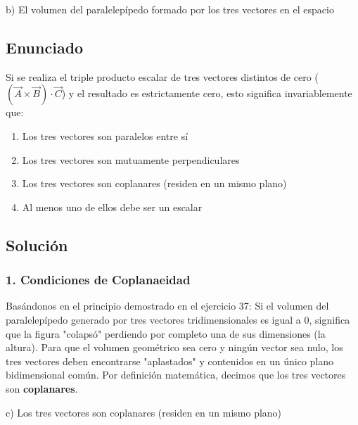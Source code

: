 \documentclass[12pt, a4paper]{article}
\begin{document}
\begin{tcolorbox}[colback=green!5!white, colframe=green!50!black, title=Respuesta Final]
\centering \Large b) El volumen del paralelepípedo formado por los tres vectores en el espacio
\end{tcolorbox}

\newpage


\subsection*{Enunciado}
Si se realiza el triple producto escalar de tres vectores distintos de cero ($(\vec{A} \times \vec{B}) \cdot \vec{C}$) y el resultado es estrictamente cero, esto significa invariablemente que:
\begin{enumerate}[label=\alph*)]
    \item Los tres vectores son paralelos entre sí
    \item Los tres vectores son mutuamente perpendiculares
    \item Los tres vectores son coplanares (residen en un mismo plano)
    \item Al menos uno de ellos debe ser un escalar
\end{enumerate}

\subsection*{Solución}

\subsubsection*{1. Condiciones de Coplanaeidad}
Basándonos en el principio demostrado en el ejercicio 37:
Si el volumen del paralelepípedo generado por tres vectores tridimensionales es igual a $0$, significa que la figura "colapsó" perdiendo por completo una de sus dimensiones (la altura). 
Para que el volumen geométrico sea cero y ningún vector sea nulo, los tres vectores deben encontrarse "aplastados" y contenidos en un único plano bidimensional común. Por definición matemática, decimos que los tres vectores son \textbf{coplanares}.

\begin{tcolorbox}[colback=green!5!white, colframe=green!50!black, title=Respuesta Final]
\centering \Large c) Los tres vectores son coplanares (residen en un mismo plano)
\end{tcolorbox}
\end{document}
